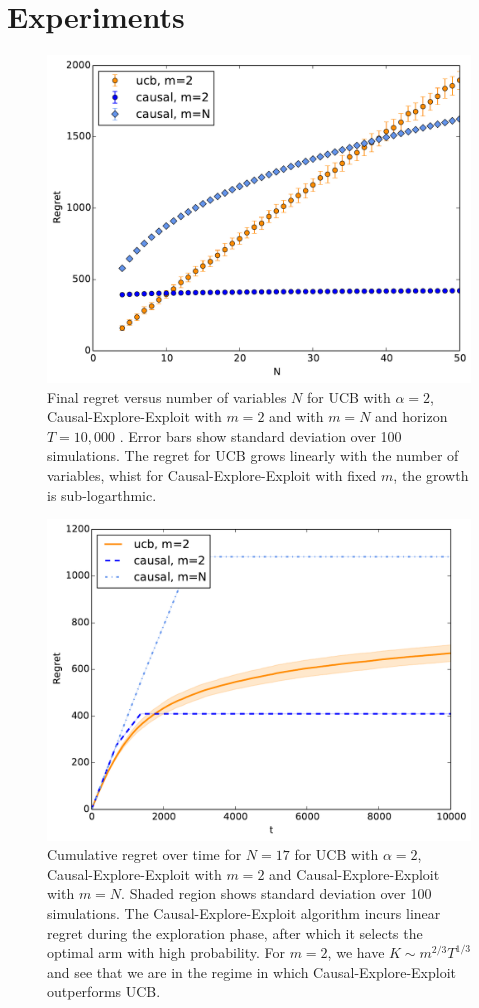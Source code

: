 \documentclass{article}
\theoremstyle{plain}
\theoremstyle{definition}
\begin{document}
\section{Experiments}

\begin{figure}
\caption{Final regret versus number of variables $N$ for UCB with $\alpha = 2$, Causal-Explore-Exploit with $m=2$ and with $m=N$ and horizon $T = 10,000$ . Error bars show standard deviation over 100 simulations. The regret for UCB grows linearly with the number of variables, whist for Causal-Explore-Exploit with fixed $m$, the growth is sub-logarthmic.  }
\label{fig:known_q_r_vs_N}
\centering
\includegraphics[width=.5\textwidth]{exp_regret_vs_N_T10000_sims100_20151229_113550.pdf}
\end{figure}

\begin{figure}
\caption{Cumulative regret over time for $N = 17$ for UCB with $\alpha=2$, Causal-Explore-Exploit with $m=2$ and Causal-Explore-Exploit with $m=N$. Shaded region shows standard deviation over 100 simulations. The Causal-Explore-Exploit algorithm incurs linear regret during the exploration phase, after which it selects the optimal arm with high probability. For $m=2$, we have $K \sim m^{2/3}T^{1/3}$ and see that we are in the regime in which Causal-Explore-Exploit outperforms UCB.}
\label{fig:known_q_r_vs_t}
\centering
\includegraphics[width=.5\textwidth]{exp_regret_vs_t_T10000_N17_sims100_20151229_120647.pdf}
\end{figure}
\end{document}
